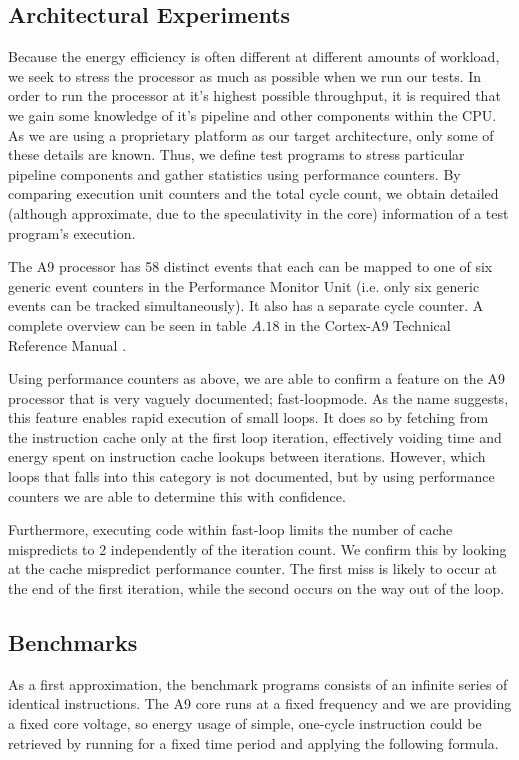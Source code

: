 \subsection{Architectural Experiments}
\label{arch_experiments}
Because the energy efficiency is often different at different amounts of
workload, we seek to stress the processor as much as possible when we run our
tests. In order to run the processor at it's highest possible throughput, it is
required that we gain some knowledge of it's pipeline and other components
within the CPU. As we are using a proprietary platform as our target
architecture, only some of these details are known. Thus, we define test
programs to stress particular pipeline components and gather statistics using
performance counters. By comparing execution unit counters and the total cycle
count, we obtain detailed (although approximate, due to the speculativity in the
core) information of a test program's execution. 

The A9 processor has 58 distinct events that each can be mapped to one of six
generic event counters in the Performance Monitor Unit (i.e. only six generic
events can be tracked simultaneously). It also has a separate cycle counter. A
complete overview can be seen in table $A.18$ in the Cortex-A9 Technical
Reference Manual \cite{armtech}.

Using performance counters as above, we are able to confirm a feature on the A9
processor that is very vaguely documented; fast-loop\texttrademark mode. As the
name suggests, this feature enables rapid execution of small loops. It does so
by fetching from the instruction cache only at the first loop iteration,
effectively voiding time and energy spent on instruction cache lookups between
iterations. However, which loops that falls into this category is not
documented, but by using performance counters we are able to determine this with
confidence.

Furthermore, executing code within fast-loop limits the number of cache
mispredicts to 2 independently of the iteration count. We confirm this by
looking at the cache mispredict  performance counter. The first miss
is likely to occur at the end of the first iteration, while the second occurs on
the way out of the loop.

\subsection{Benchmarks}
As a first approximation, the benchmark programs consists of an infinite series
of identical instructions. The A9 core runs at a fixed frequency and we are
providing a fixed core voltage, so energy usage of simple, one-cycle instruction
could be retrieved by running for a fixed time period and applying the following
formula.

